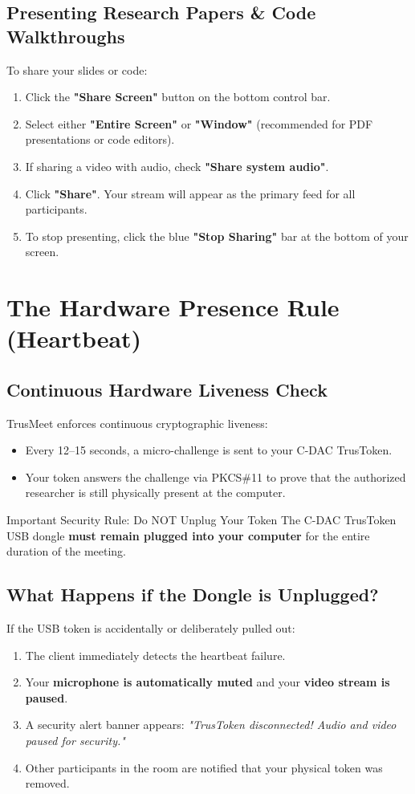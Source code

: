 \documentclass[11pt,a4paper]{report}
\begin{document}
\section{Presenting Research Papers \& Code Walkthroughs}
To share your slides or code:
\begin{enumerate}[noitemsep]
    \item Click the \textbf{"Share Screen"} button on the bottom control bar.
    \item Select either \textbf{"Entire Screen"} or \textbf{"Window"} (recommended for PDF presentations or code editors).
    \item If sharing a video with audio, check \textbf{"Share system audio"}.
    \item Click \textbf{"Share"}. Your stream will appear as the primary feed for all participants.
    \item To stop presenting, click the blue \textbf{"Stop Sharing"} bar at the bottom of your screen.
\end{enumerate}

\newpage
\chapter{The Hardware Presence Rule (Heartbeat)}

\section{Continuous Hardware Liveness Check}
TrusMeet enforces continuous cryptographic liveness:
\begin{itemize}
    \item Every 12--15 seconds, a micro-challenge is sent to your C-DAC TrusToken.
    \item Your token answers the challenge via PKCS\#11 to prove that the authorized researcher is still physically present at the computer.
\end{itemize}

\begin{alertbox}{Important Security Rule: Do NOT Unplug Your Token}
The C-DAC TrusToken USB dongle \textbf{must remain plugged into your computer} for the entire duration of the meeting.
\end{alertbox}

\section{What Happens if the Dongle is Unplugged?}
If the USB token is accidentally or deliberately pulled out:
\begin{enumerate}
    \item The client immediately detects the heartbeat failure.
    \item Your \textbf{microphone is automatically muted} and your \textbf{video stream is paused}.
    \item A security alert banner appears: \textit{"TrusToken disconnected! Audio and video paused for security."}
    \item Other participants in the room are notified that your physical token was removed.
\end{enumerate}
\end{document}
